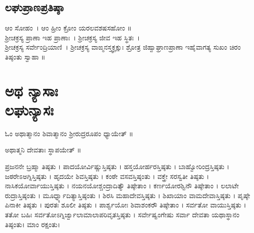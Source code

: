 \section{ಲಘುಪ್ರಾಣಪ್ರತಿಷ್ಠಾ}
ಆಂ ಸೋಹಂ~। ಆಂ ಹ್ರೀಂ ಕ್ರೋಂ ಯರಲವಶಷಸಹೋಂ ॥\\
ಶ್ರೀಚಕ್ರಸ್ಯ ಪ್ರಾಣಾ ಇಹ ಪ್ರಾಣಾಃ~।
ಶ್ರೀಚಕ್ರಸ್ಯ ಜೀವ ಇಹ ಸ್ಥಿತಃ~।\\
ಶ್ರೀಚಕ್ರಸ್ಯ ಸರ್ವೇಂದ್ರಿಯಾಣಿ~।
ಶ್ರೀಚಕ್ರಸ್ಯ ವಾಙ್ಮನಸ್ತ್ವಕ್ಚಕ್ಷುಃ ಶ್ರೋತ್ರ ಜಿಹ್ವಾಘ್ರಾಣಪ್ರಾಣಾ
ಇಹೈವಾಗತ್ಯ ಸುಖಂ ಚಿರಂ ತಿಷ್ಠಂತು ಸ್ವಾಹಾ ॥



\chapter*{\center\Huge ಅಥ ನ್ಯಾಸಾಃ\\
{\LARGE ಲಘುನ್ಯಾಸಃ}}
ಓಂ ಅಥಾತ್ಮಾನಂ ಶಿವಾತ್ಮಾನಂ ಶ್ರೀರುದ್ರರೂಪಂ ಧ್ಯಾಯೇತ್ ॥

ಅಥಾತ್ಮನಿ ದೇವತಾಃ ಸ್ಥಾಪಯೇತ್ ॥

ಪ್ರಜನನೇ ಬ್ರಹ್ಮಾ ತಿಷ್ಠತು । ಪಾದಯೋರ್ವಿಷ್ಣುಸ್ತಿಷ್ಠತು । ಹಸ್ತಯೋರ್ಹರಸ್ತಿಷ್ಠತು । ಬಾಹ್ವೋರಿಂದ್ರಸ್ತಿಷ್ಠತು । ಜಠರೇಽಅಗ್ನಿಸ್ತಿಷ್ಠತು । ಹೃದಯೇ ಶಿವಸ್ತಿಷ್ಠತು । ಕಂಠೇ ವಸವಸ್ತಿಷ್ಠಂತು । ವಕ್ತ್ರೇ ಸರಸ್ವತೀ ತಿಷ್ಠತು । ನಾಸಿಕಯೋರ್ವಾಯುಸ್ತಿಷ್ಠತು । ನಯನಯೋಶ್ಚಂದ್ರಾದಿತ್ಯೌ ತಿಷ್ಠೇತಾಂ । ಕರ್ಣಯೋರಶ್ವಿನೌ ತಿಷ್ಠೇತಾಂ । ಲಲಾಟೇ ರುದ್ರಾಸ್ತಿಷ್ಠಂತು । ಮೂರ್ಧ್ನ್ಯಾದಿತ್ಯಾಸ್ತಿಷ್ಠಂತು । ಶಿರಸಿ ಮಹಾದೇವಸ್ತಿಷ್ಠತು । ಶಿಖಾಯಾಂ ವಾಮದೇವಾಸ್ತಿಷ್ಠತು । ಪೃಷ್ಠೇ ಪಿನಾಕೀ ತಿಷ್ಠತು । ಪುರತಃ ಶೂಲೀ ತಿಷ್ಠತು । ಪಾರ್ಶ್ವಯೋಃ ಶಿವಾಶಂಕರೌ ತಿಷ್ಠೇತಾಂ । ಸರ್ವತೋ ವಾಯುಸ್ತಿಷ್ಠತು । ತತೋ ಬಹಿಃ ಸರ್ವತೋಽಗ್ನಿರ್ಜ್ವಾಲಾಮಾಲಾಪರಿವೃತಸ್ತಿಷ್ಠತು । ಸರ್ವೇಷ್ವಂಗೇಷು ಸರ್ವಾ ದೇವತಾ ಯಥಾಸ್ಥಾನಂ ತಿಷ್ಠಂತು। ಮಾಂ ರಕ್ಷಂತು।

